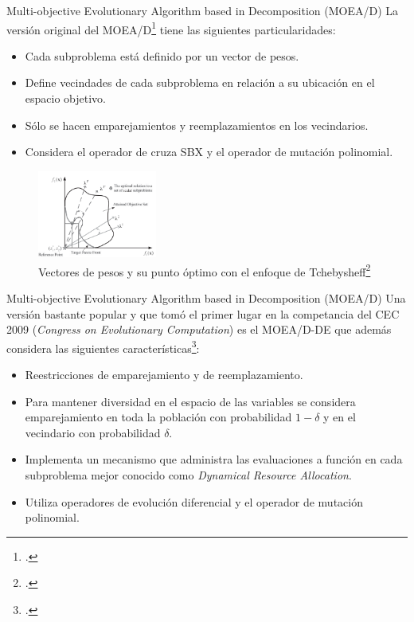 \documentclass{beamer}
\begin{document}
\begin{frame}{Multi-objective Evolutionary Algorithm based in Decomposition (MOEA/D)}
\scriptsize
La versión original del MOEA/D\footcite{ishibuchi1998multi} tiene las siguientes particularidades:
\begin{itemize}
\scriptsize
    \item Cada subproblema está definido por un vector de pesos.
    \item Define vecindades de cada subproblema en relación a su ubicación en el espacio objetivo.
    \item Sólo se hacen emparejamientos y reemplazamientos en los vecindarios.
    \item Considera el operador de cruza SBX y el operador de mutación polinomial.
\end{itemize}
\begin{figure}[H]
\centering
\includegraphics[width=0.35\textwidth]{moead_diagrama.png}
\caption{\scriptsize Vectores de pesos y su punto óptimo con el enfoque de Tchebysheff\footcite{Joel:MOEAD_Adaptative}}
\end{figure}

\end{frame}

\begin{frame}{Multi-objective Evolutionary Algorithm based in Decomposition (MOEA/D)}
\scriptsize
Una versión bastante popular y que tomó el primer lugar en la competancia del CEC 2009 (\textit{Congress on Evolutionary Computation}) es el  MOEA/D-DE que además considera las siguientes características\footcite{li2009multiobjective}: 
\begin{itemize}
\scriptsize
    \item Reestricciones de emparejamiento y de reemplazamiento.
    \item Para mantener diversidad en el espacio de las variables se considera emparejamiento en toda la población con probabilidad $1 - \delta$ y en el vecindario con probabilidad $\delta$. 
    \item Implementa un mecanismo que administra las evaluaciones a función en cada subproblema mejor conocido como \textit{Dynamical Resource Allocation}.
    \item Utiliza operadores de evolución diferencial y el operador de mutación polinomial.
\end{itemize}
\end{frame}
\end{document}
